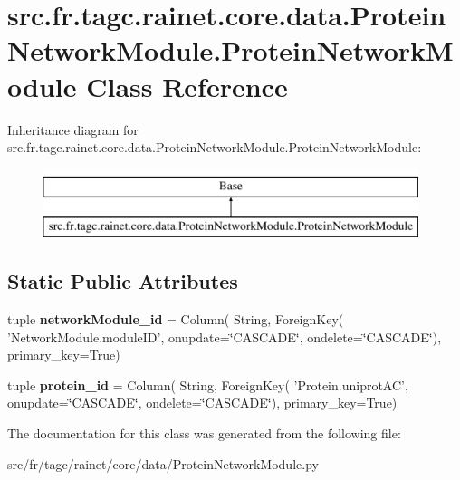 \hypertarget{classsrc_1_1fr_1_1tagc_1_1rainet_1_1core_1_1data_1_1ProteinNetworkModule_1_1ProteinNetworkModule}{\section{src.\-fr.\-tagc.\-rainet.\-core.\-data.\-Protein\-Network\-Module.\-Protein\-Network\-Module Class Reference}
\label{classsrc_1_1fr_1_1tagc_1_1rainet_1_1core_1_1data_1_1ProteinNetworkModule_1_1ProteinNetworkModule}
}
Inheritance diagram for src.\-fr.\-tagc.\-rainet.\-core.\-data.\-Protein\-Network\-Module.\-Protein\-Network\-Module\-:\begin{figure}[H]
\begin{center}
\leavevmode
\includegraphics[height=2.000000cm]{classsrc_1_1fr_1_1tagc_1_1rainet_1_1core_1_1data_1_1ProteinNetworkModule_1_1ProteinNetworkModule}
\end{center}
\end{figure}
\subsection*{Static Public Attributes}
\begin{DoxyCompactItemize}
\item 
\hypertarget{classsrc_1_1fr_1_1tagc_1_1rainet_1_1core_1_1data_1_1ProteinNetworkModule_1_1ProteinNetworkModule_a325bbb58d3d51f9d6bde8b826160b921}{tuple {\bfseries network\-Module\-\_\-id} = Column( String, Foreign\-Key( 'Network\-Module.\-module\-I\-D', onupdate=\char`\"{}C\-A\-S\-C\-A\-D\-E\char`\"{}, ondelete=\char`\"{}C\-A\-S\-C\-A\-D\-E\char`\"{}), primary\-\_\-key=True)}\label{classsrc_1_1fr_1_1tagc_1_1rainet_1_1core_1_1data_1_1ProteinNetworkModule_1_1ProteinNetworkModule_a325bbb58d3d51f9d6bde8b826160b921}

\item 
\hypertarget{classsrc_1_1fr_1_1tagc_1_1rainet_1_1core_1_1data_1_1ProteinNetworkModule_1_1ProteinNetworkModule_abd6f37d8c0c31d0fa179eb84a27bb45a}{tuple {\bfseries protein\-\_\-id} = Column( String, Foreign\-Key( 'Protein.\-uniprot\-A\-C', onupdate=\char`\"{}C\-A\-S\-C\-A\-D\-E\char`\"{}, ondelete=\char`\"{}C\-A\-S\-C\-A\-D\-E\char`\"{}), primary\-\_\-key=True)}\label{classsrc_1_1fr_1_1tagc_1_1rainet_1_1core_1_1data_1_1ProteinNetworkModule_1_1ProteinNetworkModule_abd6f37d8c0c31d0fa179eb84a27bb45a}

\end{DoxyCompactItemize}


The documentation for this class was generated from the following file\-:\begin{DoxyCompactItemize}
\item 
src/fr/tagc/rainet/core/data/Protein\-Network\-Module.\-py\end{DoxyCompactItemize}
